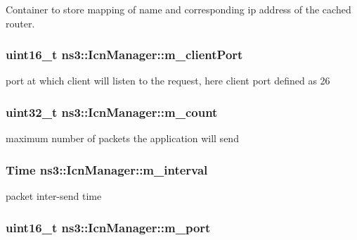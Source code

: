 Container to store mapping of name and corresponding ip address of the cached router. 

\hypertarget{classns3_1_1IcnManager_a704ea4271e14eb01e05318496c2b5d72}{
\subsubsection[{m\-\_\-client\-Port}]{\setlength{\rightskip}{0pt plus 5cm}uint16\-\_\-t ns3\-::\-Icn\-Manager\-::m\-\_\-client\-Port\hspace{0.3cm}{\ttfamily [private]}}}\label{classns3_1_1IcnManager_a704ea4271e14eb01e05318496c2b5d72}


port at which client will listen to the request, here client port defined as 26 

\hypertarget{classns3_1_1IcnManager_a43c8815cc7e2746f7c96e8e847ee6c03}{
\subsubsection[{m\-\_\-count}]{\setlength{\rightskip}{0pt plus 5cm}uint32\-\_\-t ns3\-::\-Icn\-Manager\-::m\-\_\-count\hspace{0.3cm}{\ttfamily [private]}}}\label{classns3_1_1IcnManager_a43c8815cc7e2746f7c96e8e847ee6c03}


maximum number of packets the application will send 

\hypertarget{classns3_1_1IcnManager_a4064521e1b0c672c5cf34ae49a7a97c7}{
\subsubsection[{m\-\_\-interval}]{\setlength{\rightskip}{0pt plus 5cm}Time ns3\-::\-Icn\-Manager\-::m\-\_\-interval\hspace{0.3cm}{\ttfamily [private]}}}\label{classns3_1_1IcnManager_a4064521e1b0c672c5cf34ae49a7a97c7}


packet inter-\/send time 

\hypertarget{classns3_1_1IcnManager_a02128bc30bd364361da442f6bd799c4b}{
\subsubsection[{m\-\_\-port}]{\setlength{\rightskip}{0pt plus 5cm}uint16\-\_\-t ns3\-::\-Icn\-Manager\-::m\-\_\-port\hspace{0.3cm}{\ttfamily [private]}}}\label{classns3_1_1IcnManager_a02128bc30bd364361da442f6bd799c4b}


